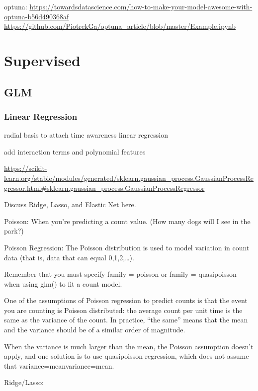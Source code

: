 \documentclass[]{book}
\begin{document}
optuna: \url{https://towardsdatascience.com/how-to-make-your-model-awesome-with-optuna-b56d490368af} \url{https://github.com/PiotrekGa/optuna_article/blob/master/Example.ipynb}

\hypertarget{supervised}{%
\section{Supervised}\label{supervised}}

\hypertarget{glm}{%
\subsection{GLM}\label{glm}}

\hypertarget{linear-regression}{%
\subsubsection{Linear Regression}\label{linear-regression}}

radial basis to attach time awareness linear regression

add interaction terms and polynomial features

\url{https://scikit-learn.org/stable/modules/generated/sklearn.gaussian_process.GaussianProcessRegressor.html\#sklearn.gaussian_process.GaussianProcessRegressor}

Discuss Ridge, Lasso, and Elastic Net here.

Poisson: When you're predicting a count value. (How many dogs will I see in the park?)

Poisson Regression: The Poisson distribution is used to model variation in count data (that is, data that can equal 0,1,2,\ldots{}).

Remember that you must specify family = poisson or family = quasipoisson when using glm() to fit a count model.

One of the assumptions of Poisson regression to predict counts is that the event you are counting is Poisson distributed: the average count per unit time is the same as the variance of the count. In practice, ``the same'' means that the mean and the variance should be of a similar order of magnitude.

When the variance is much larger than the mean, the Poisson assumption doesn't apply, and one solution is to use quasipoisson regression, which does not assume that variance=meanvariance=mean.

Ridge/Lasso:
\end{document}
